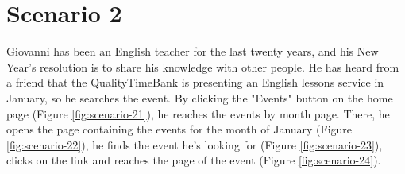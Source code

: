 \documentclass[a4paper, 11pt, parskip=half, headsepline]{scrreprt}
\begin{document}
\section{Scenario 2}	

Giovanni has been an English teacher for the last twenty years, and his New Year's resolution is to share his knowledge with other people. He has heard from a friend that the QualityTimeBank is presenting an English lessons service in January, so he searches the event. By clicking the "Events" button on the home page (Figure \ref{fig:scenario-21}), he reaches the events by month page. There, he opens the page containing the events for the month of January (Figure \ref{fig:scenario-22}), he finds the event he's looking for (Figure \ref{fig:scenario-23}), clicks on the link and reaches the page of the event (Figure \ref{fig:scenario-24}).
\end{document}
